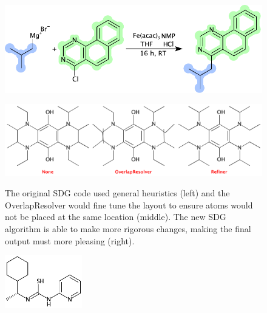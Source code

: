 \documentclass[doublespacing]{bmcart}
\begin{document}
\begin{backmatter}
\begin{figure}[h!]
  \caption{}
  \centering
  \includegraphics[width=\textwidth]{img/US20140231770A1_0287.pdf}
  \label{fig:depiction}
\end{figure}

\begin{figure}[h!]
  \caption{
    The original SDG code used general heuristics (left) and the
    OverlapResolver would fine tune the layout to ensure atoms would not be placed
    at the same location (middle). The new SDG algorithm is able to
    make more rigorous changes, making the final output must more pleasing
    (right).}
    \includegraphics[width=\textwidth]{sdg.png}
    \label{fig:sdg}
\end{figure}

\begin{figure}[h!]
  \caption{}
  \centering
  \includegraphics[width=0.3\textwidth]{sdg2.pdf}
  \label{fig:sdgstereo}
\end{figure}



\end{backmatter}
\end{document}
